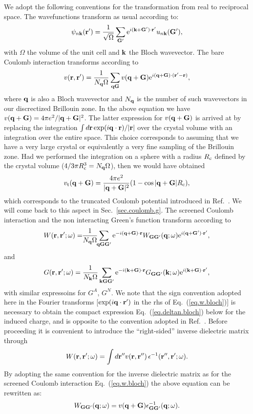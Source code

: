 \documentclass[twocolumn,prb,showpacs,superscriptaddress]{revtex4}
\def\w{\omega}
\def\q{{\bf q}}
\def\k{{\bf k}}
\def\G{{\bf G}}
\def\Gp{{\bf G^\prime}}
\def\r{{\bf r}}
\def\rp{{\bf r^\prime}}
\def\rpp{{\bf r^{\prime\prime}}}
\begin{document}
We adopt the following conventions for the transformation from real to reciprocal space.
The wavefunctions transform as usual according to:
  \begin{equation}
  \psi_{n\k}(\rp)=\frac{1}{\sqrt{\Omega}}\sum_\Gp
  {\rm e}^{i(\k+\Gp)\cdot\rp} u_{n\k}(\Gp),
  \end{equation}
with $\Omega$ the volume of the unit cell and $\k$ the Bloch wavevector.
The bare Coulomb interaction transforms according to
  \begin{equation}
  v(\r,\rp) = \frac{1}{N_\q\Omega}  \sum_{\q\G} v(\q+\G)
  {\rm e}^{i(\q+\G)\cdot(\rp-\r)},
  \end{equation}
where $\q$ is also a Bloch wavevector and $N_\q$ is the number of such wavevectors
in our discrectized Brillouin zone. In the above equation we have 
$v(\q+\G) = 4\pi e^2/|\q+\G|^2$.
The latter expression for $v(\q+\G)$ is arrived at by replacing
the integration $\int d\r \exp(i\q\cdot\r)/|\r|$ over the crystal volume with
an integration over the entire space. This choice corresponds to assuming that we
have a very large crystal or equivalently a very fine sampling of the Brillouin zone.
Had we performed the integration on a sphere
with a radius $R_{\rm c}$ defined by the crystal volume 
($4/3\pi R_{\rm c}^3 = N_\q \Omega$), then we would have obtained
  \begin{equation}
  v_{\rm t} (\q+\G) = \frac{4\pi e^2}{|\q+\G|^2} (1-\cos |\q+\G| R_{\rm c}),
  \end{equation}
which corresponds to the truncated Coulomb potential introduced in Ref.\ .
We will come back to this aspect in Sec.\ \ref{sec.coulomb.g}.
The screened Coulomb interaction and the non interacting Green's function
transform according to
  \begin{equation}\label{eq.w.bloch}
  W(\r,\rp;\w) = \!\!\frac{1}{N_\q\Omega} \!\! \sum_{\q\G\Gp} 
  {\rm e}^{-i(\q+\G)\cdot\r}
  W_{\G\Gp}(\q;\w)
  {\rm e}^{i(\q+\Gp)\cdot\rp},
  \end{equation}
and
  \begin{equation}
  G (\r,\rp;\w) = \frac{1}{N_\k\Omega}  \sum_{\k\G\Gp} 
   {\rm e}^{-i(\k+\G)\cdot\r} 
   G_{\G\Gp}(\k;\w)
   {\rm e}^{i(\k+\G)\cdot\rp},
  \end{equation}
with similar expressoins for $G^A$, $G^N$.
We note that the sign convention adopted here in the Fourier transforms
[${\rm exp}(i\q\cdot\rp)$ in the rhs of Eq.\ (\ref{eq.w.bloch})]
is necessary to obtain the compact expression Eq.\ (\ref{eq.deltan.bloch}) below
for the induced charge, and is opposite to the convention adopted in Ref.~.
Before proceeding it is convenient to introduce the ``right-sided'' inverse dielectric matrix
through
  \begin{equation}
  W(\r,\rp;\w) = \int d\rpp v(\r,\rpp) \, \epsilon^{-1}(\rpp,\rp;\w).
  \end{equation}
By adopting the same convention for the inverse dielectric matrix
as for the screened Coulomb interaction Eq.\ (\ref{eq.w.bloch})
the above equation can be rewritten as:
  \begin{equation}\label{eq.Wg}
  W_{\G\Gp}(\q;\w) = v(\q+\G)  \epsilon^{-1}_{\G\Gp}(\q;\w).
  \end{equation}
\end{document}
